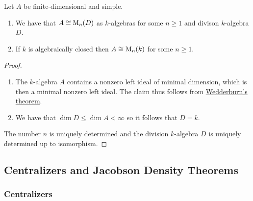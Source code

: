 

\begin{corollary}[Wedderburn]
  \label{corollary: wedderburn for algebras}
  Let $A$ be finite-dimensional and simple.
  \begin{enumerate}
    \item
      We have that $A \cong \operatorname{M}_n(D)$ as $k$-algebras for some $n \geq 1$ and divison $k$-algebra $D$.
    \item
      If $k$ is algebraically closed then $A \cong \operatorname{M}_n(k)$ for some $n \geq 1$.
  \end{enumerate}
\end{corollary}


\begin{proof}
  \leavevmode
  \begin{enumerate}
    \item
      The $k$-algebra $A$ contains a nonzero left ideal of minimal dimension, which is then a minimal nonzero left ideal.
      The claim thus follows from \hyperref[theorem: wedderburns theorem]{Wedderburn’s theorem}.
    \item
      We have that $\dim D \leq \dim A < \infty$ so it follows that $D = k$.
    \qedhere
  \end{enumerate}
  The number $n$ is uniquely determined and the division $k$-algebra $D$ is uniquely determined up to isomorphism.
\end{proof}





\subsection*{Centralizers and Jacobson Density Theorems}



\subsubsection{Centralizers}

